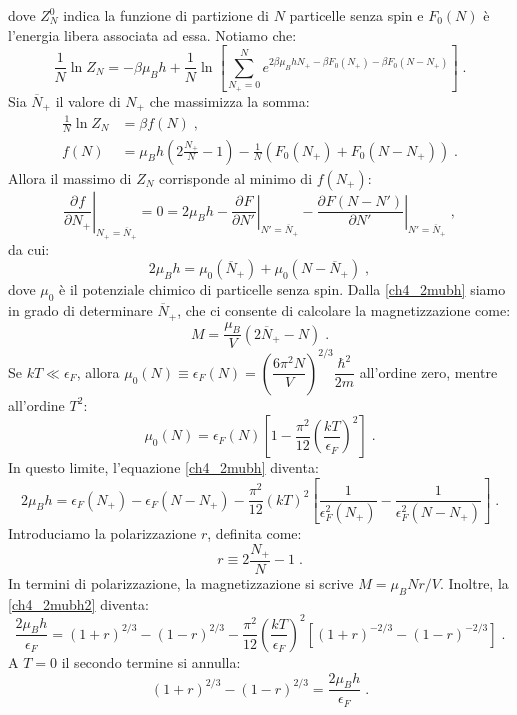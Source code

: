 \documentclass[10pt,a4paper]{report}
\theoremstyle{definition}
\newcommand{\pdev}[3][]{\frac{\partial^{#1} #2}{\partial #3^{#1}}}
\numberwithin{equation}{section}
\begin{document}
dove $Z_N^0$ indica la funzione di partizione di $N$ particelle senza spin e $F_0(N)$ è l'energia libera associata ad essa. Notiamo che:
$$
\frac{1}{N}\ln Z_N=-\beta\mu_Bh+\frac{1}{N}\ln\left[\sum_{N_+=0}^Ne^{2\beta\mu_BhN_+-\beta F_0(N_+)-\beta F_0(N-N_+)}\right]\;.
$$
Sia $\overline{N}_+$ il valore di $N_+$ che massimizza la somma:
\begin{align*}
\frac{1}{N}\ln Z_N &=\beta f(N)\;, \\
f(N) &= \mu_Bh\left(2\frac{N_+}{N}-1\right)-\frac{1}{N}\left(F_0(N_+)+F_0(N-N_+)\right)\;.
\end{align*}
Allora il massimo di $Z_N$ corrisponde al minimo di $f(N_+)$:
$$
\left.\pdev{f}{N_+}\right|_{N_+=\overline{N}_+}=0=2\mu_Bh-\left.\pdev{F}{N'}\right|_{N'=\overline{N}_+}-\left.\pdev{F(N-N')}{N'}\right|_{N'=\overline{N}_+}\;,
$$
da cui:
\begin{equation}
2\mu_Bh=\mu_0(\overline{N}_+)+\mu_0(N-\overline{N}_+)\;, \label{ch4_2mubh}
\end{equation}
dove $\mu_0$ è il potenziale chimico di particelle senza spin. Dalla \eqref{ch4_2mubh} siamo in grado di determinare $\overline{N}_+$, che ci consente di calcolare la magnetizzazione come:
\begin{equation}
M=\frac{\mu_B}{V}(2\overline{N}_+-N)\;.
\end{equation}
Se $kT\ll\epsilon_F$, allora $\mu_0(N)\equiv \epsilon_F(N)=\left(\dfrac{6\pi^2N}{V}\right)^{2/3}\dfrac{\hbar^2}{2m}$ all'ordine zero, mentre all'ordine $T^2$:
\begin{equation}
\mu_0(N)=\epsilon_F(N)\left[1-\frac{\pi^2}{12}\left(\frac{kT}{\epsilon_F}\right)^2\right]\;.
\end{equation}
In questo limite, l'equazione \eqref{ch4_2mubh} diventa:
\begin{equation}
2\mu_Bh=\epsilon_F(N_+)-\epsilon_F(N-N_+)-\frac{\pi^2}{12}(kT)^2\left[\frac{1}{\epsilon_F^2(N_+)}-\frac{1}{\epsilon_F^2(N-N_+)}\right]\;. \label{ch4_2mubh2}
\end{equation}
Introduciamo la polarizzazione $r$, definita come:
\begin{equation}
r\equiv 2\frac{N_+}{N}-1\;.
\end{equation}
In termini di polarizzazione, la magnetizzazione si scrive $M=\mu_BNr/V$. Inoltre, la \eqref{ch4_2mubh2} diventa:
$$
\frac{2\mu_Bh}{\epsilon_F}=(1+r)^{2/3}-(1-r)^{2/3}-\frac{\pi^2}{12}\left(\frac{kT}{\epsilon_F}\right)^2\left[(1+r)^{-2/3}-(1-r)^{-2/3}\right]\;.
$$
A $T=0$ il secondo termine si annulla:
$$
(1+r)^{2/3}-(1-r)^{2/3}=\frac{2\mu_Bh}{\epsilon_F}\;.
$$
\end{document}
